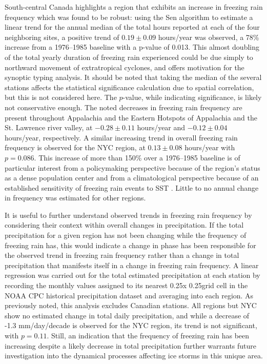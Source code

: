 \documentclass[twocol]{ametsoc}
\begin{document}
South-central Canada highlights a region that exhibits an increase in freezing rain frequency which was found to be robust: using the Sen algorithm to estimate a linear trend for the annual median of the total hours reported at each of the four neighboring sites, a positive trend of $0.19\pm0.09$ hours/year was observed, a 78\% increase from a 1976--1985 baseline with a p-value of 0.013. This almost doubling of the total yearly duration of freezing rain experienced could be due simply to northward movement of extratropical cyclones, and offers motivation for the synoptic typing analysis. It should be noted that taking the median of the several stations affects the statistical significance calculation due to spatial correlation, but this is not considered here. The $p$-value, while indicating significance, is likely not conservative enough. The noted decreases in freezing rain frequency are present throughout Appalachia and the Eastern Hotspots of Appalachia and the St. Lawrence river valley, at $-0.28\pm0.11$ hours/year and $-0.12\pm0.04$ hours/year, respectively. A similar increasing trend in overall freezing rain frequency is observed for the NYC region, at $0.13\pm0.08$ hours/year with $p=0.086$. This increase of more than 150\% over a 1976--1985 baseline is of particular interest from a policymaking perspective because of the region's status as a dense population center and from a climatological perspective because of an established sensitivity of freezing rain events to SST \citep{ramos2006sensitivity}. Little to no annual change in frequency was estimated for other regions.

It is useful to further understand observed trends in freezing rain frequency by considering their context within overall changes in precipitation. If the total precipitation for a given region has not been changing while the frequency of freezing rain has, this would indicate a change in phase has been responsible for the observed trend in freezing rain frequency rather than a change in total precipitation that manifests itself in a change in freezing rain frequency. A linear regression was carried out for the total estimated precipitation at each station by recording the monthly values assigned to its nearest 0.25\degree x 0.25\degree grid cell in the NOAA CPC historical precipitation dataset and averaging into each region. As previously noted, this analysis excludes Canadian stations. All regions but NYC show no estimated change in total daily precipitation, and while a decrease of -1.3 mm/day/decade is observed for the NYC region, its trend is not significant, with $p=0.11$. Still, an indication that the frequency of freezing rain has been increasing despite a likely decrease in total precipitation further warrants future investigation into the dynamical processes affecting ice storms in this unique area. 
\end{document}
